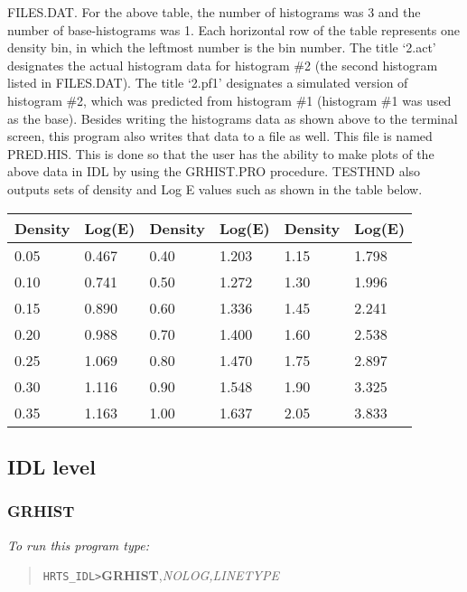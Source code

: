    FILES.DAT. For the above table, the number of histograms was 3 and the
   number of base-histograms was 1.  Each horizontal row of the table
   represents one density bin, in which the leftmost number is the bin
   number.  The title `2.act' designates the actual histogram data for
   histogram \#2 (the second histogram listed in FILES.DAT).  The title
   `2.pf1' designates a simulated version of histogram \#2, which was
   predicted from histogram \#1 (histogram \#1 was used as the base).
       Besides writing the histograms data as shown above to the terminal
   screen, this program also writes that data to a file as well.  This
   file is named PRED.HIS.  This is done so that the user has the ability
   to make plots of the above data in IDL by using the GRHIST.PRO
   procedure.
       TESTHND also outputs sets of density and Log E values such as shown
   in the table below.
\begin{center}
\begin{tabular}{||l l l l l l||}
\hline   
         Density &  Log(E) &   Density &  Log(E)  &    Density &  Log(E) \\
\hline
          0.05 &   0.467   &    0.40  &  1.203    &     1.15  &  1.798  \\ 
          0.10 &   0.741   &    0.50  &  1.272    &     1.30  &  1.996  \\ 
          0.15 &   0.890   &    0.60  &  1.336    &     1.45  &  2.241  \\ 
          0.20 &   0.988   &    0.70  &  1.400    &     1.60  &  2.538  \\ 
          0.25 &   1.069   &    0.80  &  1.470    &     1.75  &  2.897  \\ 
          0.30 &   1.116   &    0.90  &  1.548    &     1.90  &  3.325  \\ 
          0.35 &   1.163   &    1.00  &  1.637    &     2.05  &  3.833  \\ 
\hline
\end{tabular}
\end{center}

\subsection{IDL level}

\subsubsection{GRHIST}

{\em To run this program type:}
\begin{quote}   
     {\tt HRTS\_IDL>}{\bf GRHIST},{\it NOLOG,LINETYPE}              
\end{quote}

